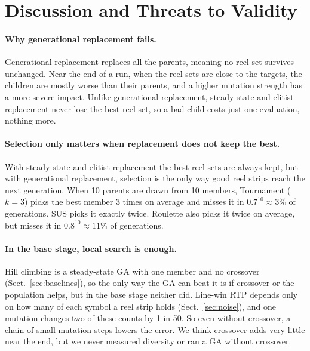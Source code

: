 \section{Discussion and Threats to Validity}
\label{sec:discussion}

\paragraph{Why generational replacement fails.} Generational replacement replaces all the parents, meaning no reel set survives unchanged. Near the end of a run, when the reel sets are close to the targets, the children are mostly worse than their parents, and a higher mutation strength has a more severe impact. Unlike generational replacement, steady-state and elitist replacement never lose the best reel set, so a bad child costs just one evaluation, nothing more.

\paragraph{Selection only matters when replacement does not keep the best.} With steady-state and elitist replacement the best reel sets are always kept, but with generational replacement, selection is the only way good reel strips reach the next generation. When 10 parents are drawn from 10 members, Tournament ($k = 3$) picks the best member 3 times on average and misses it in $0.7^{10} \approx 3\%$ of generations. SUS picks it exactly twice. Roulette also picks it twice on average, but misses it in $0.8^{10} \approx 11\%$ of generations.
\paragraph{In the base stage, local search is enough.} Hill climbing is a steady-state GA with one member and no crossover (Sect.~\ref{sec:baselines}), so the only way the GA can beat it is if crossover or the population helps, but in the base stage neither did. Line-win RTP depends only on how many of each symbol a reel strip holds (Sect.~\ref{sec:noise}), and one mutation changes two of these counts by 1 in 50. So even without crossover, a chain of small mutation steps lowers the error. We think crossover adds very little near the end, but we never measured diversity or ran a GA without crossover.

